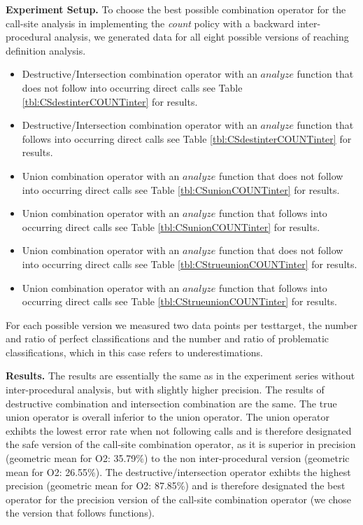 \textbf{Experiment Setup.}
To choose the best possible combination operator for the call-site analysis in implementing the \textit{count} policy with a backward inter-procedural analysis, 
we generated data for all eight possible versions of reaching definition analysis.
\begin{itemize}
\item Destructive/Intersection combination operator with an $analyze$ function that does not follow into occurring direct calls see Table \ref{tbl:CSdestinterCOUNTinter} for results.
\item Destructive/Intersection combination operator with an $analyze$ function that follows into occurring direct calls see Table \ref{tbl:CSdestinterCOUNTinter} for results.
\item Union combination operator with an $analyze$ function that does not follow into occurring direct calls see Table \ref{tbl:CSunionCOUNTinter} for results.
\item Union combination operator with an $analyze$ function that follows into occurring direct calls see Table \ref{tbl:CSunionCOUNTinter} for results.
\item Union combination operator with an $analyze$ function that does not follow into occurring direct calls see Table \ref{tbl:CStrueunionCOUNTinter} for results.
\item Union combination operator with an $analyze$ function that follows into occurring direct calls see Table \ref{tbl:CStrueunionCOUNTinter} for results.
\end{itemize}
For each possible version we measured two data points per testtarget, the number and ratio of perfect classifications and the number and ratio of problematic 
classifications, which in this case refers to underestimations.

\textbf{Results.} The results are essentially the same as in the experiment series without inter-procedural analysis, but with slightly higher precision. 
The results of destructive combination and intersection combination are the same. The true union operator is overall inferior to the union operator. The 
union operator exhibts the lowest error rate when not following calls and is therefore designated the safe version of the call-site combination operator, 
as it is superior in precision (geometric mean for O2: 35.79\%) to the non inter-procedural version (geometric mean for O2: 26.55\%). The 
destructive/intersection operator exhibts the highest precision (geometric mean for O2: 87.85\%) and is therefore designated the best operator for 
the precision version of the call-site combination operator (we chose the version that follows functions).

